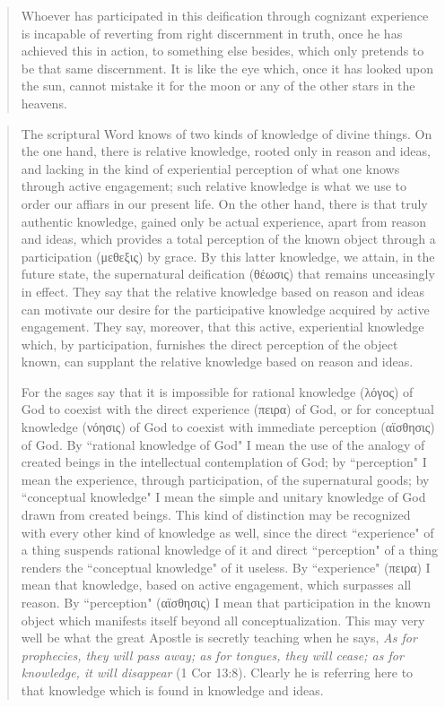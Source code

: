 \begin{quote}
	Whoever has participated in this deification through cognizant experience is incapable of reverting from right discernment in truth, once he has achieved this in action, to something else besides, which only pretends to be that same discernment. It is like the eye which, once it has looked upon the sun, cannot mistake it for the moon or any of the other stars in the heavens.
\end{quote}

\begin{quote}
	The scriptural Word knows of two kinds of knowledge of divine things. On the one hand, there is relative knowledge, rooted only in reason and ideas, and lacking in the kind of experiential perception of what one knows through active engagement; such relative knowledge is what we use to order our affiars in our present life. On the other hand, there is that truly authentic knowledge, gained only be actual experience, apart from reason and ideas, which provides a total perception of the known object through a participation (μεθεξις) by grace. By this latter knowledge, we attain, in the future state, the supernatural deification (θέωσις) that remains unceasingly in effect. They say that the relative knowledge based on reason and ideas can motivate our desire for the participative knowledge acquired by active engagement. They say, moreover, that this active, experiential knowledge which, by participation, furnishes the direct perception of the object known, can supplant the relative knowledge based on reason and ideas.

	For the sages say that it is impossible for rational knowledge (λόγος) of God to coexist with the direct experience (πειρα) of God, or for conceptual knowledge (νόησις) of God to coexist with immediate perception (αϊσθησις) of God. By ``rational knowledge of God" I mean the use of the analogy of created beings in the intellectual contemplation of God; by ``perception" I mean the experience, through participation, of the supernatural goods; by ``conceptual knowledge" I mean the simple and unitary knowledge of God drawn from created beings. This kind of distinction may be recognized with every other kind of knowledge as well, since the direct ``experience" of a thing suspends rational knowledge of it and direct ``perception" of a thing renders the ``conceptual knowledge" of it useless. By ``experience" (πειρα) I mean that knowledge, based on active engagement, which surpasses all reason. By ``perception" (αϊσθησις) I mean that participation in the known object which manifests itself beyond all conceptualization. This may very well be what the great Apostle is secretly teaching when he says, \textit{As for prophecies, they will pass away; as for tongues, they will cease; as for knowledge, it will disappear} (1 Cor 13:8). Clearly he is referring here to that knowledge which is found in knowledge and ideas.
\end{quote}

